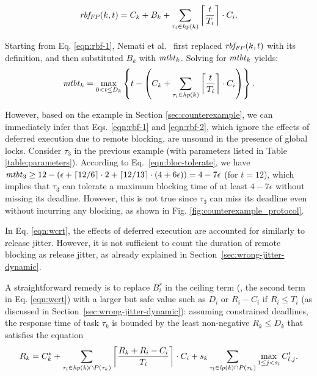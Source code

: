 \begin{equation}
\label{eqn:rbf-2}
\mathit{rbf_{FP}}(k,t) = C_k + B_k + \sum_{\tau_i \in \mathit{hp}(k)} \left \lceil \frac{t}{T_i} \right \rceil \cdot C_i.
\end{equation}

Starting from Eq. \eqref{eqn:rbf-1}, Nemati et al.~\cite{NBN:11} first  replaced $\mathit{rbf_{FP}}(k,t)$ with its definition, and then substituted  $B_k$ with $\mathit{mtbt}_k$. Solving for $\mathit{mtbt}_k$ yields:
\begin{equation}
\label{eqn:bloc-tolerate}
\mathit{mtbt}_k = \max_{0<t \leq D_k} \left\{ t - \left( C_k + \sum_{\tau_i \in \mathit{hp}(k)} \left \lceil \frac{t}{T_i} \right \rceil \cdot C_i \right) \right\}.
\end{equation}

However, based on the example in Section \ref{sec:counterexample}, we can immediately infer that Eqs. \eqref{eqn:rbf-1} and \eqref{eqn:rbf-2}, which ignore the effects of deferred execution due to remote blocking, are unsound in the presence of global locks. Consider $\tau_3$ in the previous example (with parameters listed in Table \ref{table:parameters}). According to Eq.~\eqref{eqn:bloc-tolerate}, we have $\mathit{mtbt}_3 \geq 12 - (\epsilon + \lceil 12 / 6 \rceil \cdot 2 + \lceil 12 / 13 \rceil \cdot (4+6\epsilon)) = 4-7\epsilon$ (for $t=12$), which implies that $\tau_3$ can tolerate a maximum blocking time of at least $4-7\epsilon$ without missing its deadline. However, this is not true since $\tau_3$ can miss its deadline even without incurring any blocking, as shown in Fig. \ref{fig:counterexample_protocol}. 

\label{sec:safe_bound}

In Eq. \eqref{eqn:wcrt}, the effects of deferred execution  are accounted for similarly to release jitter. However, it is not sufficient to count the duration of remote blocking as release jitter, as already explained in Section~\ref{sec:wrong-jitter-dynamic}.

A straightforward remedy is to replace $B_i^r$ in the ceiling term (\ie, the second term in Eq. \eqref{eqn:wcrt}) with a larger but safe value such as $D_i$  or $R_i - C_i$ if $R_i \leq T_i$ (as discussed in Section~\ref{sec:wrong-jitter-dynamic}): assuming constrained deadlines, the response time of task $\tau_k$ is bounded by the least non-negative $R_k \leq D_k$ that satisfies the equation
\begin{equation}
\label{eqn:wcrt-pfp-fixed}
R_k = C_k^{\ast} + \sum_{\tau_i \in \mathit{hp(k)} \cap P(\tau_k)} \left \lceil \frac{R_k + R_i - C_i}{T_i} \right \rceil \cdot C_i + s_k \sum_{\tau_l \in \mathit{lp(k)} \cap P(\tau_k)} \max_{1 \leq j < s_l} C_{l,j}^{\prime}.
\end{equation}


